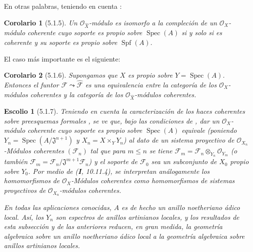\documentclass[10pt,oneside,openany]{book}
\theoremstyle{egaenv}\newtheorem*{env}{---}
\theoremstyle{egastatement}
\newtheorem*{corollary}{Corolario}
\theoremstyle{egadescription}
\newtheorem*{scholium}{Escolio}
\newcommand{\oldpage}[2][]{\marginnote{\normalfont\scriptsize\textbf{#1}\,|\,#2}\ignorespaces}
\renewcommand{\leq}{\leqslant}
\begin{document}
En otras palabras, teniendo en cuenta :

\begin{corollary}[5.1.5]
\label{III.5.1.5}
\label{III.5.1.5-fr}
Un $\mathcal O_{\widehat X}$-módulo es isomorfo a la compleción de
un $\mathcal O_X$-módulo coherente cuyo soporte es propio sobre
$\operatorname{Spec}(A)$ si y solo si es coherente y su soporte es propio
sobre $\operatorname{Spf}(A)$.
\end{corollary}

El caso más importante es el siguiente:

\begin{corollary}[5.1.6]
\label{III.5.1.6}
\label{III.5.1.6-fr}
Supongamos que $X$ es propio sobre $Y=\operatorname{Spec}(A)$. Entonces el funtor
$\mathcal F\leadsto\widehat{\mathcal F}$ es una equivalencia entre la
categoría de los $\mathcal O_X$-módulos coherentes y la categoría de los
$\mathcal O_{\widehat X}$-módulos coherentes.
\end{corollary}

\begin{scholium}[5.1.7]
\label{III.5.1.7}
\label{III.5.1.7-fr}
Teniendo en cuenta la caracterización de los haces coherentes sobre
preesquemas formales , se ve que, bajo las
condiciones de , dar un
$\mathcal O_X$-módulo coherente cuyo soporte es propio sobre $\operatorname{Spec}(A)$ \emph{equivale} (poniendo
$Y_n=\operatorname{Spec}(A/\mathfrak J^{n+1})$ y $X_n=X\times_Y Y_n$) al dato
de un sistema proyectivo de $\mathcal O_{X_n}$-Módulos coherentes $(\mathcal F_n)$ tal
que para $m\leq n$ se tiene
$\mathcal F_m=\mathcal F_n\otimes_{Y_n}\mathcal O_{Y_m}$
(o también $\mathcal F_m=\mathcal F_n/\mathfrak J^{m+1}\mathcal F_n$)
y el soporte de $\mathcal F_0$ sea un subconjunto de $X_0$
propio sobre $Y_0$. Por medio de (\textbf{I}, 10.11.4), se interpretan análogamente los homomorfismos de $\mathcal O_X$-Módulos coherentes como homomorfismos de sistemas proyectivos de $\mathcal O_{X_n}$-módulos coherentes.

\oldpage[III]{151}

En todas las aplicaciones conocidas, $A$ es de hecho un anillo
noetheriano ádico \emph{local}. Así, los $Y_n$ son espectros de anillos
\emph{artinianos locales}, y los resultados de esta subsección y de las
anteriores reducen, en gran medida, la geometría algebraica sobre un
anillo noetheriano ádico local a la geometría algebraica sobre anillos
artinianos locales.
\end{scholium}
\end{document}
